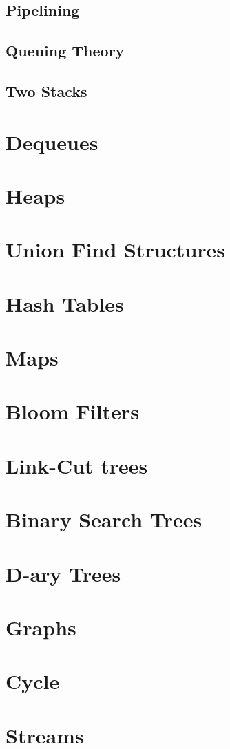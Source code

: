 \documentclass[12pt, letterpaper]{book}
\begin{document}
	\subsection{Pipelining}
	\subsection{Queuing Theory}
	\subsection{Two Stacks}

\section{Dequeues}
\section{Heaps}
\section{Union Find Structures}
\section{Hash Tables}
\section{Maps}
\section{Bloom Filters}
\section{Link-Cut trees}
\section{Binary Search Trees}
\section{D-ary Trees}
\section{Graphs}
\section{Cycle}
\section{Streams} \label{streams}
\end{document}
